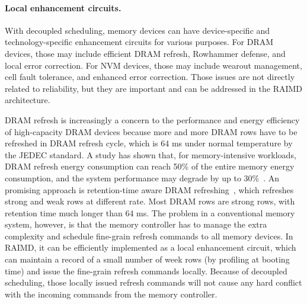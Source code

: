 \documentclass[11pt]{article}
\begin{document}
\paragraph{Local enhancement circuits.}  With decoupled scheduling, memory
devices can have device-specific and technology-specific enhancement circuits
for various purposes.  For DRAM devices, those may include efficient DRAM
refresh, Rowhammer defense, and local error correction.  For NVM devices, those
may include wearout management, cell fault tolerance, and enhanced error
correction.  Those issues are not directly related to reliability, but they are
important and can be addressed in the RAIMD architecture.

DRAM refresh is increasingly a concern to the performance and energy efficiency
of high-capacity DRAM devices because more and more DRAM rows have to be
refreshed in DRAM refresh cycle, which is 64 ms under normal temperature by the
JEDEC standard.  A study has shown that, for memory-intensive workloads, DRAM
refresh energy consumption can reach 50\% of the entire memory energy
consumption, and the system performance may degrade by up to
30\%~\cite{Bhati:isca15}.  An promising approach is retention-time aware DRAM
refreshing~\cite{hamamoto1998retention,liu2012raidr,Liu2013,Patel2017}, which refreshes strong and weak rows at different rate.
Most DRAM rows are strong rows, with retention time much longer than 64 ms.  The
problem in a conventional memory system, however, is that the memory controller
has to manage the extra complexity and schedule fine-grain refresh commands to
all memory devices.  In RAIMD, it can be efficiently implemented as a local
enhancement circuit, which can maintain a record of a small number of week rows
(by profiling at booting time) and issue the fine-grain refresh commands
locally.  Because of decoupled scheduling, those locally issued refresh commands
will not cause any hard conflict with the incoming commands from the memory
controller.
\end{document}
